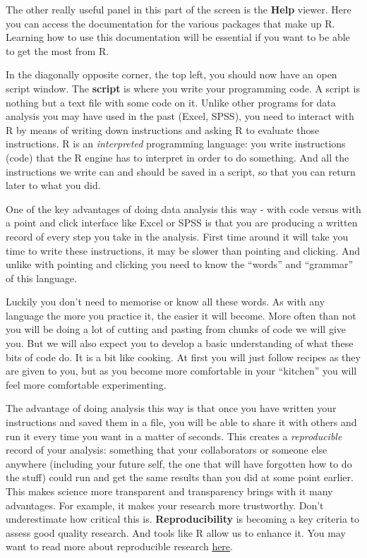 \documentclass[]{book}
\theoremstyle{definition}
\theoremstyle{definition}
\theoremstyle{definition}
\theoremstyle{remark}
\begin{document}
The other really useful panel in this part of the screen is the
\textbf{Help} viewer. Here you can access the documentation for the
various packages that make up R. Learning how to use this documentation
will be essential if you want to be able to get the most from R.

In the diagonally opposite corner, the top left, you should now have an
open script window. The \textbf{script} is where you write your
programming code. A script is nothing but a text file with some code on
it. Unlike other programs for data analysis you may have used in the
past (Excel, SPSS), you need to interact with R by means of writing down
instructions and asking R to evaluate those instructions. R is an
\emph{interpreted} programming language: you write instructions (code)
that the R engine has to interpret in order to do something. And all the
instructions we write can and should be saved in a script, so that you
can return later to what you did.

One of the key advantages of doing data analysis this way - with code
versus with a point and click interface like Excel or SPSS is that you
are producing a written record of every step you take in the analysis.
First time around it will take you time to write these instructions, it
may be slower than pointing and clicking. And unlike with pointing and
clicking you need to know the ``words'' and ``grammar'' of this
language.

Luckily you don't need to memorise or know all these words. As with any
language the more you practice it, the easier it will become. More often
than not you will be doing a lot of cutting and pasting from chunks of
code we will give you. But we will also expect you to develop a basic
understanding of what these bits of code do. It is a bit like cooking.
At first you will just follow recipes as they are given to you, but as
you become more comfortable in your ``kitchen'' you will feel more
comfortable experimenting.

The advantage of doing analysis this way is that once you have written
your instructions and saved them in a file, you will be able to share it
with others and run it every time you want in a matter of seconds. This
creates a \emph{reproducible} record of your analysis: something that
your collaborators or someone else anywhere (including your future self,
the one that will have forgotten how to do the stuff) could run and get
the same results than you did at some point earlier. This makes science
more transparent and transparency brings with it many advantages. For
example, it makes your research more trustworthy. Don't underestimate
how critical this is. \textbf{Reproducibility} is becoming a key
criteria to assess good quality research. And tools like R allow us to
enhance it. You may want to read more about reproducible research
\href{http://theconversation.com/the-science-reproducibility-crisis-and-what-can-be-done-about-it-74198}{here}.
\end{document}
